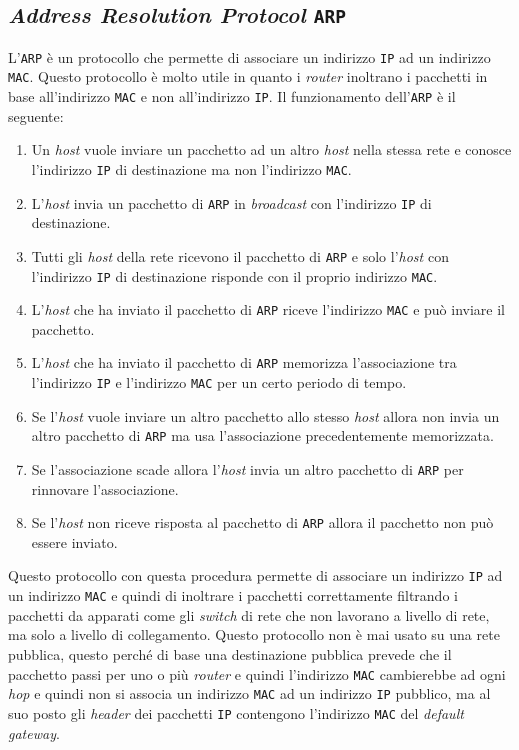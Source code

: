     \subsection{\textit{Address Resolution Protocol} \texttt{ARP}}
        L'\texttt{ARP} è un protocollo che permette di associare un indirizzo \texttt{IP} ad un indirizzo \texttt{MAC}. Questo protocollo è molto utile in quanto i \textit{router} inoltrano i pacchetti in base all'indirizzo \texttt{MAC} e non all'indirizzo \texttt{IP}. Il funzionamento dell'\texttt{ARP} è il seguente: \begin{enumerate}
            \item Un \textit{host} vuole inviare un pacchetto ad un altro \textit{host} nella stessa rete e conosce l'indirizzo \texttt{IP} di destinazione ma non l'indirizzo \texttt{MAC}.
            \item L'\textit{host} invia un pacchetto di \texttt{ARP} in \textit{broadcast} con l'indirizzo \texttt{IP} di destinazione.
            \item Tutti gli \textit{host} della rete ricevono il pacchetto di \texttt{ARP} e solo l'\textit{host} con l'indirizzo \texttt{IP} di destinazione risponde con il proprio indirizzo \texttt{MAC}.
            \item L'\textit{host} che ha inviato il pacchetto di \texttt{ARP} riceve l'indirizzo \texttt{MAC} e può inviare il pacchetto.
            \item L'\textit{host} che ha inviato il pacchetto di \texttt{ARP} memorizza l'associazione tra l'indirizzo \texttt{IP} e l'indirizzo \texttt{MAC} per un certo periodo di tempo.
            \item Se l'\textit{host} vuole inviare un altro pacchetto allo stesso \textit{host} allora non invia un altro pacchetto di \texttt{ARP} ma usa l'associazione precedentemente memorizzata.
            \item Se l'associazione scade allora l'\textit{host} invia un altro pacchetto di \texttt{ARP} per rinnovare l'associazione.
            \item Se l'\textit{host} non riceve risposta al pacchetto di \texttt{ARP} allora il pacchetto non può essere inviato.
        \end{enumerate}
        Questo protocollo con questa procedura permette di associare un indirizzo \texttt{IP} ad un indirizzo \texttt{MAC} e quindi di inoltrare i pacchetti correttamente filtrando i pacchetti da apparati come gli \textit{switch} di rete che non lavorano a livello di rete, ma solo a livello di collegamento.\newline
        Questo protocollo non è mai usato su una rete pubblica, questo perché di base una destinazione pubblica prevede che il pacchetto passi per uno o più \textit{router} e quindi l'indirizzo \texttt{MAC} cambierebbe ad ogni \textit{hop} e quindi non si associa un indirizzo \texttt{MAC} ad un indirizzo \texttt{IP} pubblico, ma al suo posto gli \textit{header} dei pacchetti \texttt{IP} contengono l'indirizzo \texttt{MAC} del \textit{default gateway}.
